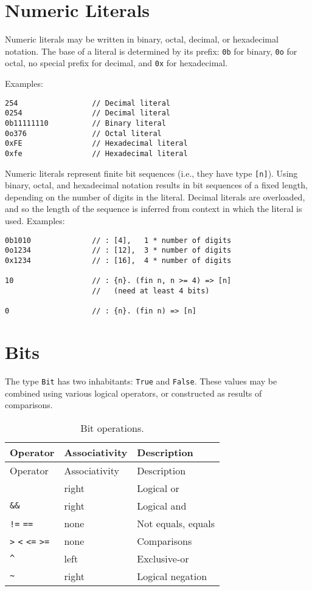 \section{Numeric Literals}\label{numeric-literals}

Numeric literals may be written in binary, octal, decimal, or
hexadecimal notation. The base of a literal is determined by its prefix:
\texttt{0b} for binary, \texttt{0o} for octal, no special prefix for
decimal, and \texttt{0x} for hexadecimal.

Examples:

\begin{verbatim}
254                 // Decimal literal
0254                // Decimal literal
0b11111110          // Binary literal
0o376               // Octal literal
0xFE                // Hexadecimal literal
0xfe                // Hexadecimal literal
\end{verbatim}

Numeric literals represent finite bit sequences (i.e., they have type
\texttt{{[}n{]}}). Using binary, octal, and hexadecimal notation results
in bit sequences of a fixed length, depending on the number of digits in
the literal. Decimal literals are overloaded, and so the length of the
sequence is inferred from context in which the literal is used.
Examples:

\begin{verbatim}
0b1010              // : [4],   1 * number of digits
0o1234              // : [12],  3 * number of digits
0x1234              // : [16],  4 * number of digits

10                  // : {n}. (fin n, n >= 4) => [n]
                    //   (need at least 4 bits)

0                   // : {n}. (fin n) => [n]
\end{verbatim}

\section{Bits}\label{bits}

The type \texttt{Bit} has two inhabitants: \texttt{True} and
\texttt{False}. These values may be combined using various logical
operators, or constructed as results of comparisons.

\begin{longtable}[c]{@{}lll@{}}
\caption{Bit operations.}\tabularnewline
\toprule
Operator & Associativity & Description\tabularnewline
\midrule
\endfirsthead
\toprule
Operator & Associativity & Description\tabularnewline
\midrule
\endhead
\texttt{\textbar{}\textbar{}} & right & Logical or\tabularnewline
\texttt{\&\&} & right & Logical and\tabularnewline
\texttt{!=} \texttt{==} & none & Not equals, equals\tabularnewline
\texttt{\textgreater{}} \texttt{\textless{}} \texttt{\textless{}=}
\texttt{\textgreater{}=} & none & Comparisons\tabularnewline
\texttt{\^{}} & left & Exclusive-or\tabularnewline
\texttt{\textasciitilde{}} & right & Logical negation\tabularnewline
\bottomrule
\end{longtable}

